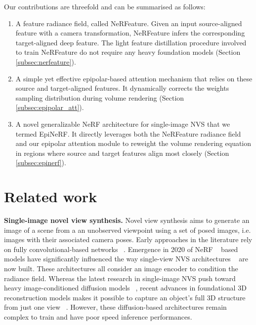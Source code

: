 Our contributions are threefold and can be summarised as follows: 
\begin{enumerate}
   \item A  feature radiance field, called NeRFeature. Given an input source-aligned feature with a camera transformation, NeRFeature infers the corresponding target-aligned deep feature. The light feature distillation procedure involved to train NeRFeature do not require any heavy foundation models (Section \ref{subsec:nerfeature}). 
    \item A simple yet effective epipolar-based attention mechanism that relies on these source and target-aligned features. It dynamically corrects the weights sampling distribution during volume rendering (Section \ref{subsec:epipolar_att}). 
    \item A novel generalizable NeRF architecture for single-image \ac{NVS} that we termed EpiNeRF. It directly leverages both the NeRFeature radiance field and our epipolar attention module to reweight the volume rendering equation in regions where source and target features align most closely (Section \ref{subsec:epinerf}).  
    
\end{enumerate}


\section{Related work}

\noindent\textbf{Single-image novel view synthesis.} Novel view synthesis aims to generate an image of a scene from a an unobserved viewpoint using a set of posed images, i.e. images with their associated camera poses. Early approaches in the literature rely on fully convolutional-based networks ~\citep{kim2020novel,hou2021novel,guo2022fast,landreau2022epipolarnvs}. Emergence in 2020 of NeRF ~\citep{mildenhall2020nerf} based models have significantly influenced the way single-view \ac{NVS} architectures ~\citep{yu2021pixelnerf,li2022symmnerf,lin2023vision} are now built. These architectures all consider an image encoder to condition the radiance field. Whereas the latest research in single-image \ac{NVS} push toward heavy image-conditioned diffusion models ~\citep{chen2023single,gu2023nerfdiff,chan2023genvs}, recent advances in foundational 3D reconstruction models makes it possible to capture an object's full 3D structure from just one view ~\citep{liu2023zero,zou2023triplane}. However, these diffusion-based architectures remain complex to train and have poor speed inference performances.  

